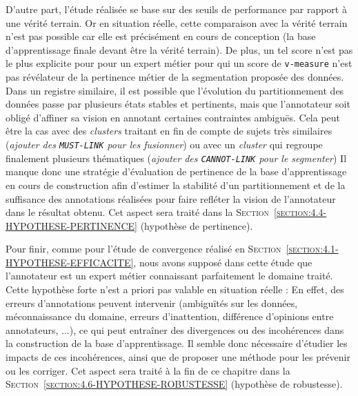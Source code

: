 			D'autre part, l'étude réalisée se base sur des seuils de performance par rapport à une vérité terrain.
			Or en situation réelle, cette comparaison avec la vérité terrain n'est pas possible car elle est précisément en cours de conception (la base d'apprentissage finale devant être la vérité terrain).
			De plus, un tel score n'est pas le plus explicite pour pour un expert métier pour qui un score de \texttt{v-measure} n'est pas révélateur de la pertinence métier de la segmentation proposée des données.
			Dans un registre similaire, il est possible que l'évolution du partitionnement des données passe par plusieurs états stables et pertinents, mais que l'annotateur soit obligé d'affiner sa vision en annotant certaines contraintes ambiguës.
			Cela peut être la cas avec des \textit{clusters} traitant en fin de compte de sujets très similaires (\textit{ajouter des \texttt{MUST-LINK} pour les fusionner}) ou avec un \textit{cluster} qui regroupe finalement plusieurs thématiques (\textit{ajouter des \texttt{CANNOT-LINK} pour le segmenter})
			Il manque donc une stratégie d'évaluation de pertinence de la base d'apprentissage en cours de construction afin d'estimer la stabilité d'un partitionnement et de la suffisance des annotations réalisées pour faire refléter la vision de l'annotateur dans le résultat obtenu.
			Cet aspect sera traité dans la \textsc{Section~\ref{section:4.4-HYPOTHESE-PERTINENCE}} (hypothèse de pertinence).
			
			Pour finir, comme pour l'étude de convergence réalisé en \textsc{Section~\ref{section:4.1-HYPOTHESE-EFFICACITE}}, nous avons supposé dans cette étude que l'annotateur est un expert métier connaissant parfaitement le domaine traité.
			Cette hypothèse forte n'est a priori pas valable en situation réelle : En effet, des erreurs d'annotations peuvent intervenir (ambiguïtés sur les données, méconnaissance du domaine, erreurs d'inattention, différence d'opinions entre annotateurs, ...), ce qui peut entraîner des divergences ou des incohérences dans la construction de la base d'apprentissage.
			Il semble donc nécessaire d'étudier les impacts de ces incohérences, ainsi que de proposer une méthode pour les prévenir ou les corriger.
			Cet aspect sera traité à la fin de ce chapitre dans la \textsc{Section~\ref{section:4.6-HYPOTHESE-ROBUSTESSE}} (hypothèse de robustesse).